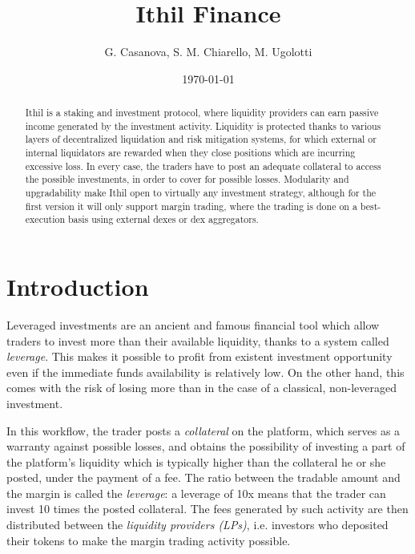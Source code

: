\documentclass [10pt, fancyhdr, twoside] {article}
\begin{document}
\title{Ithil Finance}
\author {G. Casanova,  S. M. Chiarello, M. Ugolotti}

\date{\today}

\maketitle

\begin{abstract}
Ithil is a staking and investment protocol, where liquidity providers can earn passive income generated by the investment activity. Liquidity is protected thanks to various layers of decentralized liquidation and risk mitigation systems, for which external or internal liquidators are rewarded when they close positions which are incurring excessive loss. In every case, the traders have to post an adequate collateral to access the possible investments, in order to cover for possible losses. Modularity and upgradability make Ithil open to virtually any investment strategy, although for the first version it will only support margin trading, where the trading is done on a best-execution basis using external dexes or dex aggregators.
\end{abstract}

\section{Introduction}
Leveraged investments are an ancient and famous financial tool which allow traders to invest more than their available liquidity, thanks to a system called \textit{leverage}. This makes it possible to profit from existent investment opportunity even if the immediate funds availability is relatively low. On the other hand, this comes with the risk of losing more than in the case of a classical, non-leveraged investment.

In this workflow, the trader posts a \textit{collateral} on the platform, which serves as a warranty against possible losses, and obtains the possibility of investing a part of the platform's liquidity which is typically higher than the collateral he or she posted, under the payment of a fee. The ratio between the tradable amount and the margin is called the \textit{leverage}: a leverage of 10x means that the trader can invest 10 times the posted collateral. The fees generated by such activity are then distributed between the \textit{liquidity providers (LPs)}, i.e. investors who deposited their tokens to make the margin trading activity possible.
\end{document}
